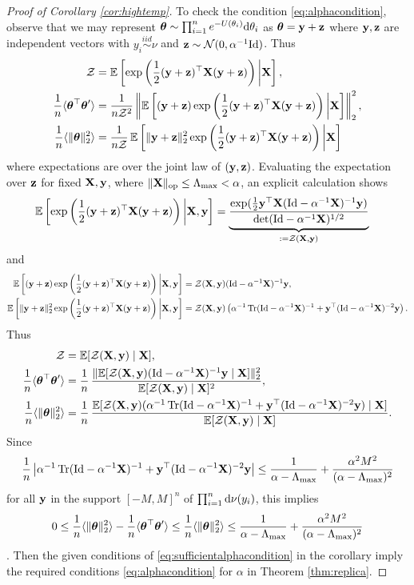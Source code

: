 \begin{proof}[Proof of Corollary \ref{cor:hightemp}]
To check the condition \eqref{eq:alphacondition}, observe that we may represent
$\boldsymbol{\theta} \sim \prod_{i=1}^n e^{-U(\theta_i)}\mathrm{d}\theta_i$
as $\boldsymbol{\theta}=\mathbf{y}+\mathbf{z}$ where $\mathbf{y},\mathbf{z}$ are independent vectors with
$y_i \overset{iid}{\sim} \nu$ and $\mathbf{z} \sim \mathcal{N}(0,\alpha^{-1}\mathrm{Id})$.
Thus
\begin{align*}
\mathcal{Z}&=\mathbb{E}\left[\exp\left(\frac{1}{2}(\mathbf{y}+\mathbf{z})^\top
\mathbf{X}(\mathbf{y}+\mathbf{z})\right)\bigg|\mathbf{X}\right],\\
\frac{1}{n}\langle \boldsymbol{\theta}^\top \boldsymbol{\theta}'\rangle
&=\frac{1}{n\mathcal{Z}^2}\left\|\mathbb{E}\left[(\mathbf{y}+\mathbf{z})
\exp\left(\frac{1}{2}(\mathbf{y}+\mathbf{z})^\top
\mathbf{X}(\mathbf{y}+\mathbf{z})\right)\bigg|\mathbf{X}\right]\right\|_2^2,\\
\frac{1}{n}\langle \|\boldsymbol{\theta}\|_2^2\rangle
&=\frac{1}{n\mathcal{Z}}\,\mathbb{E}\left[\|\mathbf{y}+\mathbf{z}\|_2^2
\exp\left(\frac{1}{2}(\mathbf{y}+\mathbf{z})^\top
\mathbf{X}(\mathbf{y}+\mathbf{z})\right)\bigg|\mathbf{X}\right]
\end{align*}
where expectations are over the joint law of $(\mathbf{y},\mathbf{z})$.
Evaluating the expectation over $\mathbf{z}$ for fixed $\mathbf{X},\mathbf{y}$,
where $\|\mathbf{X}\|_{\mathrm{op}} \leq \Lambda_{\max}<\alpha$, an explicit calculation shows
\begin{align*}
\mathbb{E}\left[\exp\left(\frac{1}{2}(\mathbf{y}+\mathbf{z})^\top
\mathbf{X}(\mathbf{y}+\mathbf{z})\right)\bigg|\mathbf{X},\mathbf{y}\right]
&=\underbrace{\frac{\exp(\frac{1}{2}\mathbf{y}^\top\mathbf{X}(\mathrm{Id}-\alpha^{-1}\mathbf{X})^{-1}\mathbf{y})}
{\det(\mathrm{Id}-\alpha^{-1}\mathbf{X})^{1/2}}}_{:=\mathcal{Z}(\mathbf{X},\mathbf{y})}
\end{align*}
and
\begin{align*}
\mathbb{E}\left[(\mathbf{y}+\mathbf{z})\exp\left(\frac{1}{2}(\mathbf{y}+\mathbf{z})^\top
\mathbf{X}(\mathbf{y}+\mathbf{z})\right)\bigg|\mathbf{X},\mathbf{y}\right]
&=\mathcal{Z}(\mathbf{X},\mathbf{y})(\mathrm{Id}-\alpha^{-1}\mathbf{X})^{-1}\mathbf{y},\\
\mathbb{E}\left[\|\mathbf{y}+\mathbf{z}\|_2^2
\exp\left(\frac{1}{2}(\mathbf{y}+\mathbf{z})^\top
\mathbf{X}(\mathbf{y}+\mathbf{z})\right)\bigg|\mathbf{X},\mathbf{y}\right]
&=\mathcal{Z}(\mathbf{X},\mathbf{y})\left(\alpha^{-1}\operatorname{Tr} (\mathrm{Id}-\alpha^{-1}\mathbf{X})^{-1}
+\mathbf{y}^\top(\mathrm{Id}-\alpha^{-1}\mathbf{X})^{-2}\mathbf{y}\right).
\end{align*}
Thus
\begin{equation}\label{eq:gaussianmixtureZ}
\begin{aligned}
\mathcal{Z}&=\mathbb{E}[\mathcal{Z}(\mathbf{X},\mathbf{y}) \mid \mathbf{X}],\\
\frac{1}{n}\langle \boldsymbol{\theta}^\top \boldsymbol{\theta}' \rangle
&=\frac{1}{n}\,\frac{\|\mathbb{E}[\mathcal{Z}(\mathbf{X},\mathbf{y})(\mathrm{Id}-\alpha^{-1}\mathbf{X})^{-1}\mathbf{y} \mid \mathbf{X}]\|_2^2}
{\mathbb{E}[\mathcal{Z}(\mathbf{X},\mathbf{y}) \mid \mathbf{X}]^2},\\
\frac{1}{n}\langle \|\boldsymbol{\theta}\|_2^2 \rangle
&=\frac{1}{n}\,\frac{\mathbb{E}[\mathcal{Z}(\mathbf{X},\mathbf{y})(\alpha^{-1}\operatorname{Tr} (\mathrm{Id}-\alpha^{-1}\mathbf{X})^{-1}
+\mathbf{y}^\top(\mathrm{Id}-\alpha^{-1}\mathbf{X})^{-2}\mathbf{y}) \mid \mathbf{X}]}{\mathbb{E}[\mathcal{Z}(\mathbf{X},\mathbf{y}) \mid \mathbf{X}]}.
\end{aligned}
\end{equation}
Since
\[\frac{1}{n}\left|\alpha^{-1}\operatorname{Tr} (\mathrm{Id}-\alpha^{-1}\mathbf{X})^{-1}
+\mathbf{y}^\top(\mathrm{Id}-\alpha^{-1}\mathbf{X})^{-2}\mathbf{y}\right|
\leq \frac{1}{\alpha-\Lambda_{\max}}+\frac{\alpha^2
M^2}{(\alpha-\Lambda_{\max})^2}\]
for all $\mathbf{y}$ in the support $[-M,M]^n$
of $\prod_{i=1}^n \mathrm{d}\nu(y_i)$, this implies
\[0 \leq \frac{1}{n}\langle \|\boldsymbol{\theta}\|_2^2\rangle
-\frac{1}{n}\langle \boldsymbol{\theta}^\top \boldsymbol{\theta}'\rangle
\leq \frac{1}{n}\langle \|\boldsymbol{\theta}\|_2^2\rangle
\leq \frac{1}{\alpha-\Lambda_{\max}}+\frac{\alpha^2
M^2}{(\alpha-\Lambda_{\max})^2}\].
Then the given conditions of \eqref{eq:sufficientalphacondition} in the
corollary imply the required conditions \eqref{eq:alphacondition} for $\alpha$
in Theorem \ref{thm:replica}.


\end{proof}
